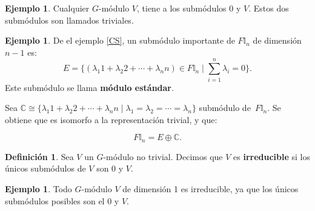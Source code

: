 \documentclass[12pt]{book}
\theoremstyle{definition}
\newtheorem{definition}[theorem]{Definición}
\newtheorem{example}[theorem]{Ejemplo}
\newcounter{in}
\newcounter{ini}
\begin{document}
\begin{example}
  Cualquier $G$-módulo $V$, tiene a los submódulos 0 y $V$. Estos dos
  submódulos son llamados triviales.
\end{example}

\begin{example}
  \label{sub-estandar}
  De el ejemplo \ref{CS}, un submódulo importante de
  $F\mathbb{I}_{n}$ de dimensión $n-1$ es:
  \begin{equation*}
    E=\Big\{(\lambda_{1}1+\lambda_{2}2+\cdots+\lambda_{n}n)\in F\mathbb{I}_{n}\mid\sum^{n}_{i=1}\lambda_{i}=0\Big\}.
  \end{equation*}
  Este submódulo se llama \textbf{módulo estándar}. 
  
  Sea $\mathbb{C}\cong
  \{\lambda_{1}1+\lambda_{2}2+\cdots+\lambda_{n}n\mid
  \lambda_{1}=\lambda_{2}=\cdots=\lambda_{n}\}$ submódulo de~$F\mathbb{I}_{n}$. Se
  obtiene que es isomorfo a la representación trivial, y que:

  \begin{equation*}
    F\mathbb{I}_{n}=E\oplus \mathbb{C}.
  \end{equation*}  
\end{example}

\begin{definition}
  Sea $V$ un $G$-módulo no trivial. Decimos que $V$ es \textbf{irreducible} si
  los únicos submódulos de $V$ son $0$ y $V$.
\end{definition}

\begin{example}
  Todo $G$-módulo $V$ de dimensión 1 es irreducible, ya que los únicos
  submódulos posibles son el 0 y $V$.
\end{example}
\end{document}

